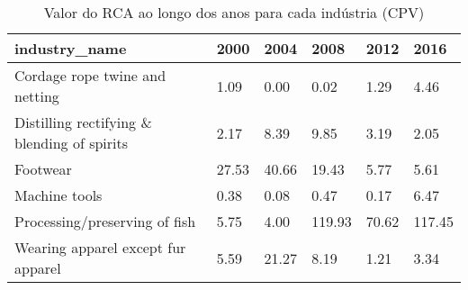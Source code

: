 \begin{table}
\centering
\caption{Valor do RCA ao longo dos anos para cada indústria (CPV)}
\begin{tabular}{p{6cm}p{1.5cm}p{1.5cm}p{1.5cm}p{1.5cm}p{1.5cm}}
\toprule
                              industry\_name &  2000 &  2004 &   2008 &  2012 &   2016 \\
\midrule
             Cordage rope twine and netting &  1.09 &  0.00 &   0.02 &  1.29 &   4.46 \\
Distilling rectifying \& blending of spirits &  2.17 &  8.39 &   9.85 &  3.19 &   2.05 \\
                                   Footwear & 27.53 & 40.66 &  19.43 &  5.77 &   5.61 \\
                              Machine tools &  0.38 &  0.08 &   0.47 &  0.17 &   6.47 \\
              Processing/preserving of fish &  5.75 &  4.00 & 119.93 & 70.62 & 117.45 \\
         Wearing apparel except fur apparel &  5.59 & 21.27 &   8.19 &  1.21 &   3.34 \\
\bottomrule
\end{tabular}
\end{table}
